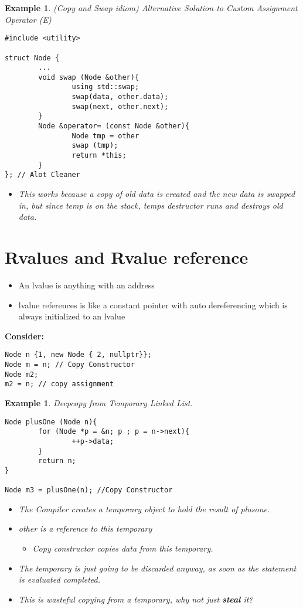 \documentclass{article}
\newtheorem{ex}[theorem]{Example}
\newenvironment{exblock}[1]{%
    \tcolorbox[beamer,%
    noparskip,breakable,
    colback=lightgreen,colframe=darkgreen,%
    colbacklower=limegreen!75!lightgreen,%
    title=#1]}%
    {\endtcolorbox}
\begin{document}
\begin{ex} (Copy and Swap idiom) Alternative Solution to Custom Assignment Operator \textit{(E)}
\begin{lstlisting}
#include <utility>

struct Node {
		...
		void swap (Node &other){
				using std::swap;
				swap(data, other.data);
				swap(next, other.next);
		}
		Node &operator= (const Node &other){
				Node tmp = other
				swap (tmp);
				return *this;
		}
}; // Alot Cleaner
\end{lstlisting}
\begin{itemize}
\item This works because a copy of old data is created and the new data is swapped in, but since temp is on the stack, temps destructor runs and destroys old data. 
\end{itemize}
\end{ex}

\section{Rvalues and Rvalue reference}

\begin{exblock}{Recall:}
\begin{itemize}
\item An lvalue is anything with an address
\item lvalue references is like a constant pointer with auto dereferencing which is always initialized to an lvalue
\end{itemize}
\end{exblock}

\textbf{Consider:}
\begin{lstlisting}
Node n {1, new Node { 2, nullptr}};
Node m = n; // Copy Constructor
Node m2;
m2 = n; // copy assignment 
\end{lstlisting}


\begin{ex} Deepcopy from Temporary Linked List.
\begin{lstlisting}
Node plusOne (Node n){
		for (Node *p = &n; p ; p = n->next){
				++p->data;
		}
		return n;
}

Node m3 = plusOne(n); //Copy Constructor 
\end{lstlisting}
\begin{itemize}
\item The Compiler creates a temporary object to hold the result of plusone.
\item other is a reference to this temporary
\begin{itemize}
\item Copy constructor copies data from this temporary. 
\end{itemize}
\item The temporary is just going to be discarded anyway, as soon as the statement is evaluated completed. 
\item This is wasteful copying from a temporary, why not just \textbf{steal} it?
\end{itemize}
\end{ex}
\end{document}
